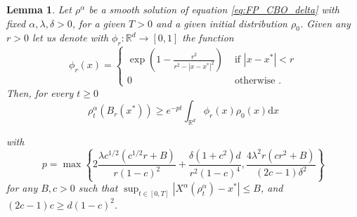 \documentclass[10pt,a4paper]{amsart}
\newtheorem{lemma}{Lemma}
\newcommand{\R}{\mathbb{R}}
\newcommand{\diff}{\mathrm{d}}
\begin{document}
\begin{lemma}\label{lemma:ball_measure}
Let {$\rho^\alpha$ %
be a %
smooth solution of equation \eqref{eq:FP_CBO_delta}} with fixed $\alpha,\lambda,\delta>0$, for a given $T>0$ and a given initial distribution $\rho_0$. Given any $r>0$ let us denote with $\phi_r:\R^d\longrightarrow[0,1]$ the function 
$$\phi_r(x) = \begin{cases}
    \exp\left(1-\frac{r^2}{r^2- |x-x^*|^2}\right) & \text{ if }  |x-x^*|<r\\
    0 & \text{ otherwise .}
\end{cases}$$
Then, for every $t\geq 0$ 
    \begin{equation}
        \rho^\alpha_t(B_r(x^*))\geq e^{-pt}\int_{\mathbb{R}^d}\phi_r(x)\rho_0(x)\diff x
    \end{equation}

with $$p =\max\left\{2\frac{\lambda c^{1/2}(c^{1/2}r+B)}{r(1-c)^2}+\frac{\delta(1+c^2)d}{r^2(1-c)^4}, \frac{4\lambda^2r(cr^2+B)}{(2c-1)\delta^2}\right\}$$
for any $B,c>0$ such that $\sup_{t\in[0,T]}|X^\alpha(\rho^\alpha_t)-x^*|\leq B$, and $(2c-1)c\geq d(1-c)^2.$
\end{lemma}
\end{document}

